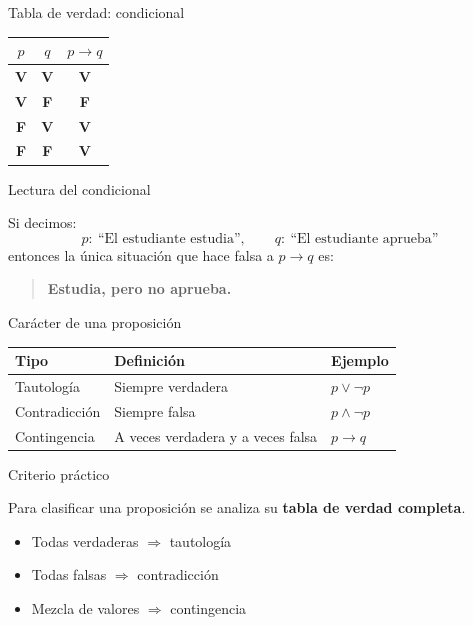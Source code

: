 \documentclass[aspectratio=169,10pt,handout]{beamer}
\newcommand{\destacado}[1]{\textcolor{PsyPrimary}{\textbf{#1}}}
\newcommand{\verdadero}{\textcolor{PsyGood}{\textbf{V}}}
\newcommand{\falso}{\textcolor{PsyBad}{\textbf{F}}}
\newenvironment{IdeaClave}[1]
{
	\begin{block}{#1}
		\justifying
	}
	{
	\end{block}
}
\newenvironment{Ejemplo}[1]
{
	\begin{exampleblock}{#1}
		\justifying
	}
	{
	\end{exampleblock}
}
\begin{document}
	\begin{frame}{Tabla de verdad: condicional}
		\begin{center}
			\renewcommand{\arraystretch}{1.5}
			\begin{tabular}{c c c}
				\toprule
				$p$ & $q$ & $p \to q$ \\
				\midrule
				\verdadero & \verdadero & \verdadero \\
				\verdadero & \falso     & \falso \\
				\falso     & \verdadero & \verdadero \\
				\falso     & \falso     & \verdadero \\
				\bottomrule
			\end{tabular}
		\end{center}
		
		\pause
		
		\begin{Ejemplo}{Lectura del condicional}
			Si decimos:
			\[
			p:\ \text{``El estudiante estudia''}, \qquad
			q:\ \text{``El estudiante aprueba''}
			\]
			entonces la única situación que hace falsa a $p \to q$ es:
			\begin{quote}
				\textbf{Estudia, pero no aprueba.}
			\end{quote}
		\end{Ejemplo}
	\end{frame}
	
	\begin{frame}{Carácter de una proposición}
		\begin{center}
			\renewcommand{\arraystretch}{1.35}
			\begin{tabular}{>{\raggedright\arraybackslash}p{2.8cm} >{\raggedright\arraybackslash}p{3.3cm} >{\raggedright\arraybackslash}p{5.2cm}}
				\toprule
				\textbf{Tipo} & \textbf{Definición} & \textbf{Ejemplo} \\
				\midrule
				Tautología & Siempre verdadera & $p \lor \neg p$ \\
				Contradicción & Siempre falsa & $p \land \neg p$ \\
				Contingencia & A veces verdadera y a veces falsa & $p \to q$ \\
				\bottomrule
			\end{tabular}
		\end{center}
		
		\pause
		
		\begin{IdeaClave}{Criterio práctico}
			Para clasificar una proposición se analiza su \destacado{tabla de verdad completa}.
			\begin{itemize}[leftmargin=*]
				\item Todas verdaderas $\Rightarrow$ tautología
				\item Todas falsas $\Rightarrow$ contradicción
				\item Mezcla de valores $\Rightarrow$ contingencia
			\end{itemize}
		\end{IdeaClave}
	\end{frame}
	
\end{document}
